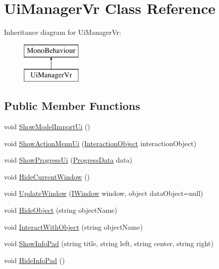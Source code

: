 \hypertarget{class_ui_manager_vr}{}\section{Ui\+Manager\+Vr Class Reference}
\label{class_ui_manager_vr}
Inheritance diagram for Ui\+Manager\+Vr\+:\begin{figure}[H]
\begin{center}
\leavevmode
\includegraphics[height=2.000000cm]{class_ui_manager_vr}
\end{center}
\end{figure}
\subsection*{Public Member Functions}
\begin{DoxyCompactItemize}
\item 
void \mbox{\hyperlink{class_ui_manager_vr_a92c0abcedbe5b18632841f7a1a0925e6}{Show\+Model\+Import\+Ui}} ()
\item 
void \mbox{\hyperlink{class_ui_manager_vr_a6525aa6d75dfa7d978ef5186d73c96b7}{Show\+Action\+Menu\+Ui}} (\mbox{\hyperlink{class_interaction_object}{Interaction\+Object}} interaction\+Object)
\item 
void \mbox{\hyperlink{class_ui_manager_vr_ad390498344390d6fc56c98346eac91ed}{Show\+Progress\+Ui}} (\mbox{\hyperlink{class_progress_data}{Progress\+Data}} data)
\item 
void \mbox{\hyperlink{class_ui_manager_vr_a0cd1c6bfde1c157ec619602de6069802}{Hide\+Current\+Window}} ()
\item 
void \mbox{\hyperlink{class_ui_manager_vr_a456f3ed4e5cb1a0022d9cebfd35d7c82}{Update\+Window}} (\mbox{\hyperlink{interface_i_window}{I\+Window}} window, object data\+Object=null)
\item 
void \mbox{\hyperlink{class_ui_manager_vr_ab88b1cbcb7449cb5486547191f1b685b}{Hide\+Object}} (string object\+Name)
\item 
void \mbox{\hyperlink{class_ui_manager_vr_aa12b63c05a476d09ac42ad93da298af0}{Interact\+With\+Object}} (string object\+Name)
\item 
void \mbox{\hyperlink{class_ui_manager_vr_afa2445911343a9737745c3fb0151d133}{Show\+Info\+Pad}} (string title, string left, string center, string right)
\item 
void \mbox{\hyperlink{class_ui_manager_vr_a7f563c162158404fe1fed2796bcac4a2}{Hide\+Info\+Pad}} ()
\end{DoxyCompactItemize}
